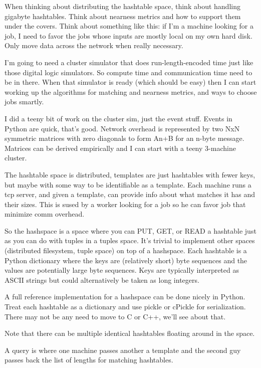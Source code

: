 \documentclass[11pt]{article}
\begin{document}
When thinking about distributing the hashtable space, think about
handling gigabyte hashtables. Think about nearness metrics and how to
support them under the covers. Think about something like this: if I'm
a machine looking for a job, I need to favor the jobs whose inputs are
mostly local on my own hard disk. Only move data across the network
when really necessary.

I'm going to need a cluster simulator that does run-length-encoded
time just like those digital logic simulators. So compute time and
communication time need to be in there. When that simulator is ready
(which should be easy) then I can start working up the algorithms for
matching and nearness metrics, and ways to choose jobs smartly.

I did a teeny bit of work on the cluster sim, just the event stuff.
Events in Python are quick, that's good. Network overhead is
represented by two NxN symmetric matrices with zero diagonals to form
An+B for an n-byte message. Matrices can be derived empirically and I
can start with a teeny 3-machine cluster.

The hashtable space is distributed, templates are just hashtables with
fewer keys, but maybe with some way to be identifiable as a template.
Each machine runs a tcp server, and given a template, can provide info
about what matches it has and their sizes. This is sused by a worker
looking for a job so he can favor job that minimize comm overhead.

So the hashspace is a space where you can PUT, GET, or READ a
hashtable just as you can do with tuples in a tuples space. It's
trivial to implement other spaces (distributed filesystem, tuple
space) on top of a hashspace. Each hashtable is a Python dictionary
where the keys are (relatively short) byte sequences and the values
are potentially large byte sequences. Keys are typically interpreted
as ASCII strings but could alternatively be taken as long integers.

A full reference implementation for a hashspace can be done nicely in
Python. Treat each hashtable as a dictionary and use pickle or cPickle
for serialization. There may not be any need to move to C or C++,
we'll see about that.

Note that there can be multiple identical hashtables floating around
in the space.

A query is where one machine passes another a template and the second
guy passes back the list of lengths for matching hashtables.
\end{document}
